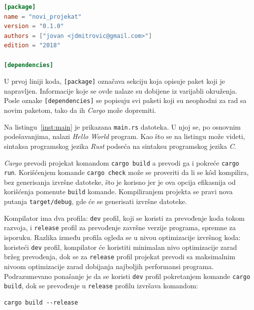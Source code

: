 \documentclass[12pt,oneside]{memoir}
\begin{document}
\begin{lstlisting}[language=TOML,
                   caption={Inicijalna \emph{Cargo.toml} datoteka},
                   label={inst:cargo}]
[package]
name = "novi_projekat"
version = "0.1.0"
authors = ["jovan <jdmitrovic@gmail.com>"]
edition = "2018"

[dependencies]
\end{lstlisting}

U prvoj liniji koda, \texttt{[package]} označava sekciju koja opisuje
paket koji je napravljen. Informacije koje se ovde nalaze su dobijene
iz varijabli okruženja. Posle oznake \texttt{[dependencies]} se
popisuju svi paketi koji su neophodni za rad sa novim paketom,
tako da ih \emph{Cargo} može dopremiti.

Na listingu~\ref{inst:main} je prikazana \texttt{main.rs} datoteka. U njoj se, po osnovnim
podešavanjima, nalazi \emph{Hello World} program. Kao što se na listingu može videti,
sintaksa programskog jezika \textit{Rust} podseća na sintaksu programskog jezika
\textit{C}.



\emph{Cargo} prevodi projekat komandom
\texttt{cargo build} a prevodi ga i pokreće
\texttt{cargo run}. Korišćenjem komande \texttt{cargo check}
može se proveriti da li se kôd kompilira, bez generisanja
izvršne datoteke, što je korisno jer je ova opcija efikasnija
od korišćenja pomenute \texttt{build} komande. Kompiliranjem
projekta se pravi nova putanja \texttt{target/debug}, gde će se
generisati izvršne datoteke.

Kompilator ima dva profila: \texttt{dev} profil, koji se koristi za prevođenje koda tokom razvoja, i
\texttt{release} profil za prevođenje završne verzije programa, spremne za isporuku. Razlika između
profila ogleda se u nivou optimizacije izvršnog koda: koristeći \texttt{dev} profil, kompilator
će koristiti minimalan nivo optimizacije zarad bržeg prevođenja, dok se za \texttt{release} profil
projekat prevodi sa maksimalnim nivoom optimizacije zarad dobijanja najboljih performansi
programa. Podrazumevano ponašanje je da se koristi \texttt{dev} profil pokretanjem
komande \texttt{cargo build}, dok se prevođenje u \texttt{release} profilu izvršava komandom:

\begin{lstlisting}[language={}, style=text]
cargo build --release
\end{lstlisting}
\end{document}
